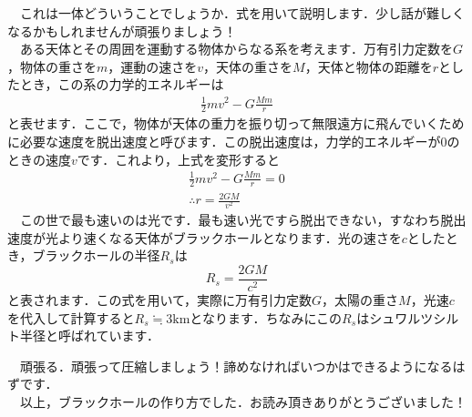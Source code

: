 \documentclass[dvipdfmx,a4paper,10pt]{jarticle}
\def\rm#1{\mathrm{#1}}
\begin{document}
\begin{tcolorbox}[enhanced,empty,left skip=0pt,left=5pt,
coltitle=white,title={\bf どういうこと？},sharp corners,
overlay={
\begin{tcbclipframe}
\fill[black] (title.south west)--++(3,0)--++(0,1)--++(-3,0)--cycle;
\end{tcbclipframe}}]
　これは一体どういうことでしょうか．式を用いて説明します．少し話が難しくなるかもしれませんが頑張りましょう！\\
　ある天体とその周囲を運動する物体からなる系を考えます．万有引力定数を$G$，物体の重さを$m$，運動の速さを$v$，天体の重さを$M$，天体と物体の距離を$r$としたとき，この系の力学的エネルギーは
\begin{gather*}
   \frac{1}{2}mv^2 - G\frac{Mm}{r}
\end{gather*}
と表せます．ここで，物体が天体の重力を振り切って無限遠方に飛んでいくために必要な速度を脱出速度と呼びます．この脱出速度は，力学的エネルギーが0のときの速度$v$です．これより，上式を変形すると
\begin{gather*}
   \frac{1}{2}mv^2 - G\frac{Mm}{r} = 0\\
   \therefore r = \frac{2GM}{v^2}
\end{gather*}
　この世で最も速いのは光です．最も速い光ですら脱出できない，すなわち脱出速度が光より速くなる天体がブラックホールとなります．光の速さを$c$としたとき，ブラックホールの半径$R_s$は
\begin{equation}
   R_s = \frac{2GM}{c^2}
\nonumber
\end{equation}
と表されます．この式を用いて，実際に万有引力定数$G$，太陽の重さ$M$，光速$c$を代入して計算すると$R_s \fallingdotseq 3\rm{km}$となります．ちなみにこの$R_s$はシュワルツシルト半径と呼ばれています．

\begin{tcolorbox}[enhanced,empty,left skip=0pt,left=5pt,
coltitle=white,title={\bf どうやって圧縮するの？},sharp corners,
overlay={
\begin{tcbclipframe}
\fill[black] (title.south west)--++(4.3,0)--++(0,1)--++(-4.3,0)--cycle;
\end{tcbclipframe}}]
　頑張る．頑張って圧縮しましょう！諦めなければいつかはできるようになるはずです．\\
　以上，ブラックホールの作り方でした．お読み頂きありがとうございました！
\end{tcolorbox}

\end{tcolorbox}
\end{document}
